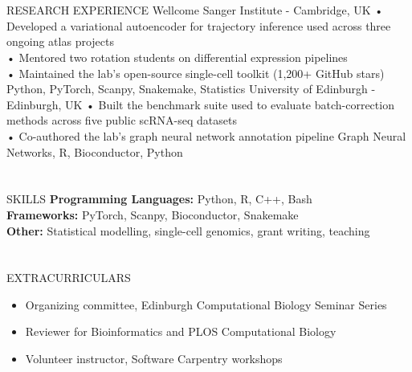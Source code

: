 \documentclass{my_cv}
\begin{document}
\section{\faLaptop}{RESEARCH EXPERIENCE}
        {Wellcome Sanger Institute - Cambridge, UK}
        {
            • Developed a variational autoencoder for trajectory inference used
            across three ongoing atlas projects
            \\ \vspace{2pt}
            • Mentored two rotation students on differential expression pipelines
            \\ \vspace{2pt}
            • Maintained the lab's open-source single-cell toolkit (1,200+ GitHub stars)
        }
        {Python, PyTorch, Scanpy, Snakemake, Statistics}
        {University of Edinburgh - Edinburgh, UK}
        {
            • Built the benchmark suite used to evaluate batch-correction methods
            across five public scRNA-seq datasets
            \\ \vspace{2pt}
            • Co-authored the lab's graph neural network annotation pipeline
        }
        {Graph Neural Networks, R, Bioconductor, Python}

\section{\faList}{SKILLS}
    \textbf{Programming Languages:} Python, R, C++, Bash \\
    \textbf{Frameworks:} PyTorch, Scanpy, Bioconductor, Snakemake \\
    \noindent\textbf{Other:} Statistical modelling, single-cell genomics, grant writing, teaching

\section{\faStar}{EXTRACURRICULARS}
    \begin{itemize}
        \item Organizing committee, Edinburgh Computational Biology Seminar Series
        \item Reviewer for Bioinformatics and PLOS Computational Biology
        \item Volunteer instructor, Software Carpentry workshops
    \end{itemize}
\end{document}
